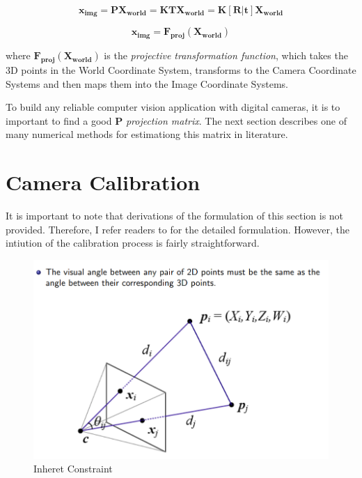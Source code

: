 \documentclass[a4paper]{report}
\numberwithin{figure}{section}
\begin{document}
\begin{equation}
  \mathbf{x_{img}} = 
  \mathbf{P}\mathbf{X_{world}} = 
  \mathbf{K}\mathbf{T}\mathbf{X_{world}} = 
  \mathbf{K}[\mathbf{R}|\mathbf{t}]\mathbf{X_{world}}
\end{equation} \label{eq:simplyfied_proj_func}

\begin{equation}
  \mathbf{x_{img}} = \mathbf{F_{proj}}(\mathbf{X_{world}})
\end{equation} \label{eq:simplyfied_proj_func}

where $\mathbf{F_{proj}}(\mathbf{X_{world}})$ is the 
\textit{projective transformation function}, which takes 
the 3D points in the World Coordinate System, transforms to 
the Camera Coordinate Systems and then maps them into the Image 
Coordinate Systems.

To build any reliable computer vision application with digital cameras, it is 
to important to find a good $\mathbf{P}$ \textit{projection matrix}. 
The next section describes one of many numerical methods for estimationg this 
matrix in literature.

\section{Camera Calibration} \label{sb_sc_calibration}


It is important to note that derivations of the formulation of this section
is not provided. Therefore, I refer readers to \cite{bla} for the detailed 
formulation. However, the intiution of the calibration process is fairly 
straightforward. 

\begin{figure}[H]
	\centering
  \includegraphics[width=\linewidth,natwidth=640,natheight=640]
  {fig/ref_imgs/calibration_dlt.png}
  \caption{Inheret Constraint}
  \label{fig:calibration_constraint}
\end{figure}
\end{document}

